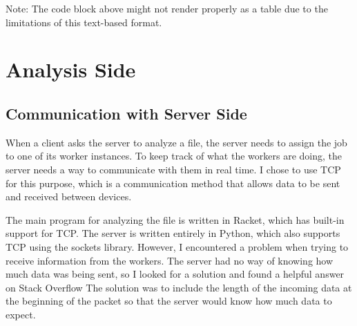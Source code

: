 Note: The code block above might not render properly as a table due to the limitations of this text-based format.


\section{Analysis Side}

\subsection{Communication with Server Side}
When a client asks the server to analyze a file,
the server needs to assign the job to one of its worker instances.
To keep track of what the workers are doing, the server needs a way to communicate with them in real time.
I chose to use TCP for this purpose, which is a communication method that allows data to be sent and received between devices.

The main program for analyzing the file is written in Racket,
which has built-in support for TCP. The server is written entirely in Python,
which also supports TCP using the sockets library.
However, I encountered a problem when trying to receive information from the workers.
The server had no way of knowing how much data was being sent,
so I looked for a solution and found a helpful answer on Stack Overflow \cite{chqrlie:2022}
The solution was to include the length of the incoming data at the beginning of the packet
so that the server would know how much data to expect.




